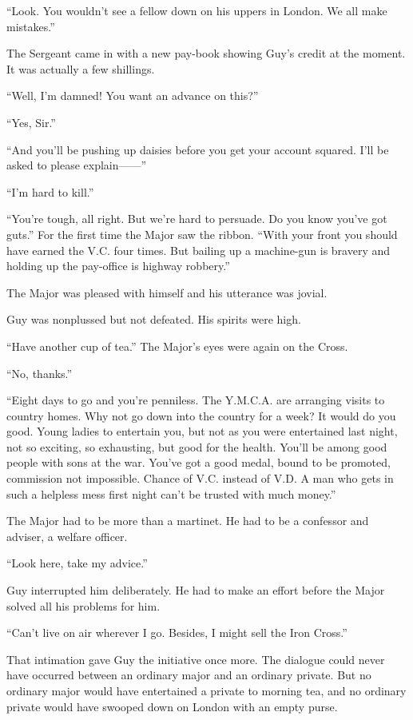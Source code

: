 ``Look. You wouldn't see a fellow down on his uppers in London. We all make mistakes.''

The Sergeant came in with a new pay-book showing Guy's credit at the moment. It was actually a few shillings.

``Well, I'm damned! You want an advance on this?''

``Yes, Sir.''

``And you'll be pushing up daisies before you get your account squared. I'll be asked to please explain------''

``I'm hard to kill.''

``You're tough, all right. But we're hard to persuade. Do you know you've got guts.'' For the first time the Major saw the ribbon. ``With your front you should have earned the V.C. four times. But bailing up a machine-gun is bravery and holding up the pay-office is highway robbery.''

The Major was pleased with himself and his utterance was jovial.

Guy was nonplussed but not defeated. His spirits were high.

``Have another cup of tea.'' The Major's eyes were again on the Cross.

``No, thanks.''

``Eight days to go and you're penniless. The Y.M.C.A. are arranging visits to country homes. Why not go down into the country for a week? It would do you good. Young ladies to entertain you, but not as you were entertained last night, not so exciting, so exhausting, but good for the health. You'll be among good people with sons at the war. You've got a good medal, bound to be promoted, commission not impossible. Chance of V.C. instead of V.D. A man who gets in such a helpless mess first night can't be trusted with much money.''

The Major had to be more than a martinet. He had to be a confessor and adviser, a welfare officer.

``Look here, take my advice.''

Guy interrupted him deliberately. He had to make an effort before the Major solved all his problems for him.

``Can't live on air wherever I go. Besides, I might sell the Iron Cross.''

That intimation gave Guy the initiative once more. The dialogue could never have occurred between an ordinary major and an ordinary private. But no ordinary major would have entertained a private to morning tea, and no ordinary private would have swooped down on London with an empty purse.

